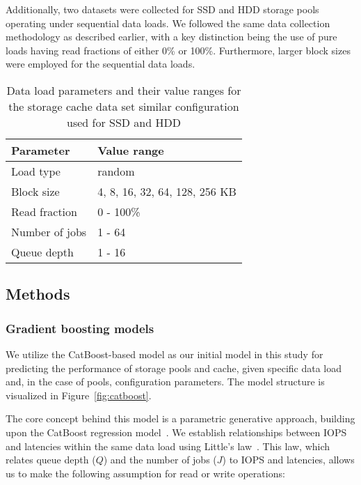     Additionally, two datasets were collected for SSD and HDD storage pools operating under sequential data loads. We followed the same data collection methodology as described earlier, with a key distinction being the use of pure loads having read fractions of either 0\% or 100\%. Furthermore, larger block sizes were employed for the sequential data loads.
    \begin{table}[h!]
    
    \caption{Data load parameters and their value ranges for the storage cache data set similar configuration used for SSD and HDD}
    \small
    \begin{tabularx}{\textwidth}{@{}p{7cm} X@{}}
    \hline
    Parameter & 
    Value range \\
    \hline
    Load type & random \\
    Block size & 4, 8, 16, 32, 64, 128, 256 KB \\
    Read fraction & 0 - 100\% \\
    Number of jobs & 1 - 64 \\
    Queue depth & 1 - 16 \\
    \hline
    \end{tabularx}
    \label{tab:data-cache}
    \end{table}
\subsection{Methods}
\subsubsection{Gradient boosting models}
We utilize the CatBoost-based model as our initial model in this study for predicting the performance of storage pools and cache, given specific data load and, in the case of pools, configuration parameters. The model structure is visualized in Figure~\ref{fig:catboost}.

The core concept behind this model is a parametric generative approach, building upon the CatBoost regression model~\cite{catboost2018}. We establish relationships between IOPS and latencies within the same data load using Little's law~\cite{10.2307/167570}. This law, which relates queue depth ($Q$) and the number of jobs ($J$) to IOPS and latencies, allows us to make the following assumption for read or write operations:


